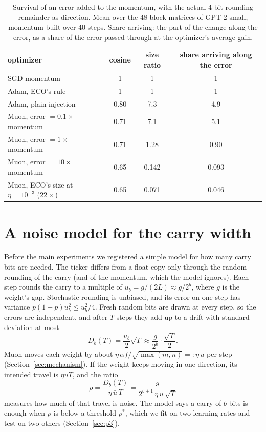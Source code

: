 \documentclass[11pt]{article}
\begin{document}
\begin{table}[t]
\centering
\caption{Survival of an error added to the momentum, with the actual 4-bit rounding remainder as direction. Mean over
the 48 block matrices of GPT-2 small, momentum built over 40 steps. Share arriving: the part of the change along the
error, as a share of the error passed through at the optimizer's average gain.}
\label{tab:m}
\begin{tabular}{lccc}
\toprule
optimizer & cosine & size ratio & share arriving along the error \\
\midrule
SGD-momentum & 1 & 1 & 1 \\
Adam, ECO's rule & 1 & 1 & 1 \\
Adam, plain injection & 0.80 & 7.3 & 4.9 \\
Muon, error $=0.1\times$ momentum & 0.71 & 7.1 & 5.1 \\
Muon, error $=1\times$ momentum & 0.71 & 1.28 & 0.90 \\
Muon, error $=10\times$ momentum & 0.65 & 0.142 & 0.093 \\
Muon, ECO's size at $\eta = 10^{-3}$ ($22\times$) & 0.65 & 0.071 & 0.046 \\
\bottomrule
\end{tabular}
\end{table}

\section{A noise model for the carry width}\label{sec:noise}

Before the main experiments we registered a simple model for how many carry bits are needed. The ticker differs from
a float copy only through the random rounding of the carry (and of the momentum, which the model ignores). Each step
rounds the carry to a multiple of $u_b = g/(2L) \approx g/2^b$, where $g$ is the weight's gap. Stochastic rounding is
unbiased, and its error on one step has variance $p(1-p)u_b^2 \le u_b^2/4$. Fresh random bits are drawn at every
step, so the errors are independent, and after $T$ steps they add up to a drift with standard deviation at most
\[
  D_b(T) = \frac{u_b}{2}\sqrt{T} \approx \frac{g}{2^b}\cdot\frac{\sqrt{T}}{2} .
\]
Muon moves each weight by about $\eta\, \alpha\bar f/\sqrt{\max(m,n)} =: \eta\, \bar u$ per step
(Section~\ref{sec:mechanism}). If the weight keeps moving in one direction, its intended travel is $\eta\bar u T$, and
the ratio
\[
  \rho = \frac{D_b(T)}{\eta\,\bar u\,T} = \frac{g}{2^{b+1}\,\eta\,\bar u\,\sqrt{T}}
\]
measures how much of that travel is noise. The model says a carry of $b$ bits is enough when $\rho$ is below a
threshold $\rho^*$, which we fit on two learning rates and test on two others (Section~\ref{sec:p3}).
\end{document}
